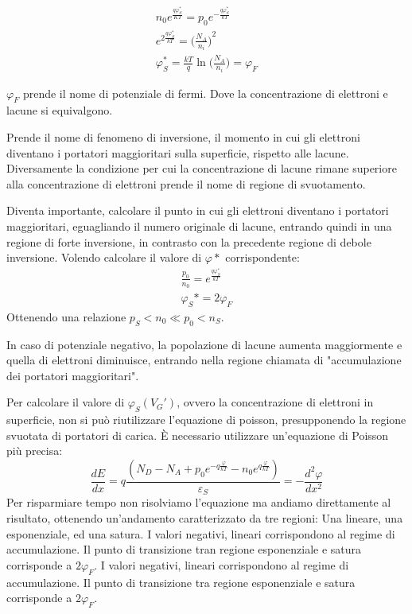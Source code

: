 \documentclass[../template]{subfiles}
\begin{document}
\begin{align*}
    n_0 e^\frac{q \varphi_S^*}{KT} = p_0 e^{-\frac{q\varphi_S^*}{kT}}
    \\
    e^{2 \frac{q\varphi_S^*}{kT}} = {\Big(\frac{N_A}{n_i}\Big)}^2
    \\
    \varphi_S^* = \frac{kT}{q} \ln\Big( \frac{N_A}{n_i}\Big) = \varphi_F
\end{align*}

$\varphi_F$ prende il nome di potenziale di fermi. Dove la concentrazione di elettroni e lacune si equivalgono.

Prende il nome di fenomeno di inversione, il momento in cui gli elettroni diventano i portatori maggioritari sulla superficie, rispetto alle lacune.
Diversamente la condizione per cui la concentrazione di lacune rimane superiore alla concentrazione di elettroni prende il nome di regione di svuotamento.


Diventa importante, calcolare il punto in cui gli elettroni diventano i portatori maggioritari, eguagliando il numero originale di lacune, entrando quindi in una regione di forte inversione, in contrasto con la precedente regione di debole inversione.
Volendo calcolare il valore di $\varphi*$ corrispondente:
\begin{align*}
    \frac{p_0}{n_0} = e^\frac{q \varphi_S^*}{kT}
    \\
    \varphi_S* = 2 \varphi_F
\end{align*}
Ottenendo una relazione $p_S < n_0 \ll p_0 < n_S$.

In caso di potenziale negativo, la popolazione di lacune aumenta maggiormente e quella di elettroni diminuisce, entrando nella regione chiamata di "accumulazione dei portatori maggioritari".


Per calcolare il valore di $\varphi_S (V_G')$, ovvero la concentrazione di elettroni in superficie, non si può riutilizzare l'equazione di poisson, presupponendo la regione svuotata di portatori di carica. È necessario utilizzare un'equazione di Poisson più precisa:
\[
    \frac{dE}{dx} = q \frac{(N_D - N_A + p_0 e^{-q\frac{\varphi}{kT}} - n_0 e^{q\frac{\varphi}{kT}})}{\varepsilon_S} = -\frac{d^2 \varphi}{d x^2}
\]
Per risparmiare tempo non risolviamo l'equazione ma andiamo direttamente al risultato, ottenendo un'andamento caratterizzato da tre regioni:
Una lineare, una esponenziale, ed una satura. I valori negativi, lineari corrispondono al regime di accumulazione. Il punto di transizione tran regione esponenziale e satura corrisponde a $2 \varphi_F$.
 I valori negativi, lineari corrispondono al regime di accumulazione. Il punto di transizione tra regione esponenziale e satura corrisponde a $2 \varphi_F$.
\end{document}
